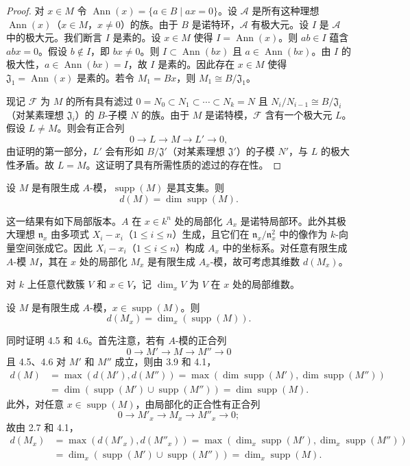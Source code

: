 \begin{proof}
对 $x\in M$ 令 $\operatorname{Ann}(x)=\{a\in B\mid ax=0\}$。设 $\mathcal{A}$ 是所有这种理想 $\operatorname{Ann}(x)$（$x\in M$，$x\neq 0$）的族。由于 $B$ 是诺特环，$\mathcal{A}$ 有极大元。设 $I$ 是 $\mathcal{A}$ 中的极大元。我们断言 $I$ 是素的。设 $x\in M$ 使得 $I=\operatorname{Ann}(x)$。则 $ab\in I$ 蕴含 $abx=0$。假设 $b\notin I$，即 $bx\neq 0$。则 $I\subset\operatorname{Ann}(bx)$ 且 $a\in\operatorname{Ann}(bx)$。由 $I$ 的极大性，$a\in\operatorname{Ann}(bx)=I$，故 $I$ 是素的。因此存在 $x\in M$ 使得 $\mathfrak{J}_1=\operatorname{Ann}(x)$ 是素的。若令 $M_1=Bx$，则 $M_1\cong B/\mathfrak{J}_1$。

现记 $\mathcal{F}$ 为 $M$ 的所有具有滤过 $0=N_0\subset N_1\subset\cdots\subset N_k=N$ 且 $N_i/N_{i-1}\cong B/\mathfrak{J}_i$（对某素理想 $\mathfrak{J}_i$）的 $B$-子模 $N$ 的族。由于 $M$ 是诺特模，$\mathcal{F}$ 含有一个极大元 $L$。假设 $L\neq M$。则会有正合列
$$0\longrightarrow L\longrightarrow M\longrightarrow L'\longrightarrow 0,$$
由证明的第一部分，$L'$ 会有形如 $B/\mathfrak{J}'$（对某素理想 $\mathfrak{J}'$）的子模 $N'$，与 $L$ 的极大性矛盾。故 $L=M$。这证明了具有所需性质的滤过的存在性。
\end{proof}

\begin{theorem}
设 $M$ 是有限生成 $A$-模，$\operatorname{supp}(M)$ 是其支集。则
$$d(M)=\dim\operatorname{supp}(M).$$
\end{theorem}

这一结果有如下局部版本。$A$ 在 $x\in k^n$ 处的局部化 $A_x$ 是诺特局部环。此外其极大理想 $\mathfrak{n}_x$ 由多项式 $X_i-x_i$（$1\le i\le n$）生成，且它们在 $\mathfrak{n}_x/\mathfrak{n}_x^2$ 中的像作为 $k$-向量空间张成它。因此 $X_i-x_i$（$1\le i\le n$）构成 $A_x$ 中的坐标系。对任意有限生成 $A$-模 $M$，其在 $x$ 处的局部化 $M_x$ 是有限生成 $A_x$-模，故可考虑其维数 $d(M_x)$。

对 $k$ 上任意代数簇 $V$ 和 $x\in V$，记 $\dim_x V$ 为 $V$ 在 $x$ 处的局部维数。

\begin{theorem}
设 $M$ 是有限生成 $A$-模，$x\in\operatorname{supp}(M)$。则
$$d(M_x)=\dim_x(\operatorname{supp}(M)).$$
\end{theorem}

同时证明 4.5 和 4.6。首先注意，若有 $A$-模的正合列
$$0\longrightarrow M'\longrightarrow M\longrightarrow M''\longrightarrow 0$$
且 4.5、4.6 对 $M'$ 和 $M''$ 成立，则由 3.9 和 4.1，
\begin{align*}
d(M)&=\max(d(M'),d(M''))=\max(\dim\operatorname{supp}(M'),\dim\operatorname{supp}(M''))\\
&=\dim(\operatorname{supp}(M')\cup\operatorname{supp}(M''))=\dim\operatorname{supp}(M).
\end{align*}
此外，对任意 $x\in\operatorname{supp}(M)$，由局部化的正合性有正合列
$$0\longrightarrow M'_x\longrightarrow M_x\longrightarrow M''_x\longrightarrow 0;$$
故由 2.7 和 4.1，
\begin{align*}
d(M_x)&=\max(d(M'_x),d(M''_x))=\max(\dim_x\operatorname{supp}(M'),\dim_x\operatorname{supp}(M''))\\
&=\dim_x(\operatorname{supp}(M')\cup\operatorname{supp}(M''))=\dim_x\operatorname{supp}(M).
\end{align*}

